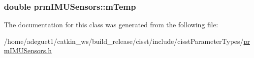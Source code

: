 \hypertarget{classprm_i_m_u_sensors_ab62434fbd875d0f7428761be427b5825}{
\subsubsection[{m\-Temp}]{\setlength{\rightskip}{0pt plus 5cm}double prm\-I\-M\-U\-Sensors\-::m\-Temp\hspace{0.3cm}{\ttfamily [protected]}}}\label{classprm_i_m_u_sensors_ab62434fbd875d0f7428761be427b5825}


The documentation for this class was generated from the following file\-:\begin{DoxyCompactItemize}
\item 
/home/adeguet1/catkin\-\_\-ws/build\-\_\-release/cisst/include/cisst\-Parameter\-Types/\hyperlink{prm_i_m_u_sensors_8h}{prm\-I\-M\-U\-Sensors.\-h}\end{DoxyCompactItemize}
